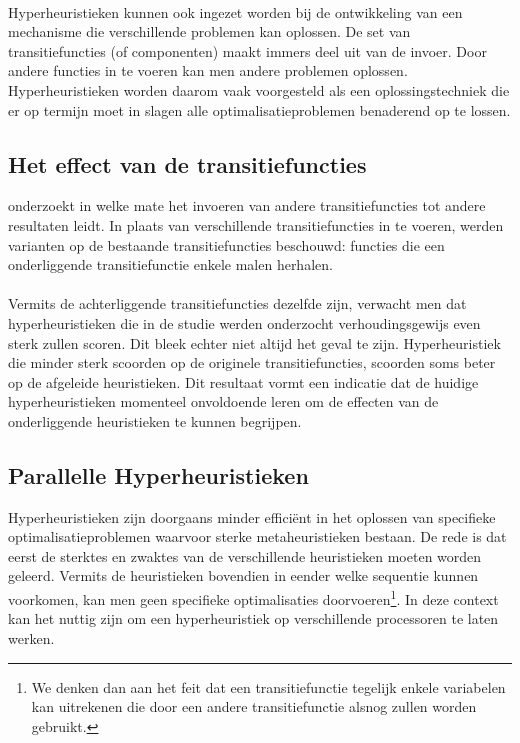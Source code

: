 \paragraph{}
Hyperheuristieken kunnen ook ingezet worden bij de ontwikkeling van een mechanisme die verschillende problemen kan oplossen. De set van transitiefuncties (of componenten) maakt immers deel uit van de invoer. Door andere functies in te voeren kan men andere problemen oplossen. Hyperheuristieken worden daarom vaak voorgesteld als een oplossingstechniek die er op termijn moet in slagen alle optimalisatieproblemen benaderend op te lossen.

\subsection{Het effect van de transitiefuncties}
\cite{DBLP:conf/ppsn/MisirVCB12} onderzoekt in welke mate het invoeren van andere transitiefuncties tot andere resultaten leidt. In plaats van verschillende transitiefuncties in te voeren, werden varianten op de bestaande transitiefuncties beschouwd: functies die een onderliggende transitiefunctie enkele malen herhalen.

\paragraph{}
Vermits de achterliggende transitiefuncties dezelfde zijn, verwacht men dat hyperheuristieken die in de studie werden onderzocht verhoudingsgewijs even sterk zullen scoren. Dit bleek echter niet altijd het geval te zijn. Hyperheuristiek die minder sterk scoorden op de originele transitiefuncties, scoorden soms beter op de afgeleide heuristieken. Dit resultaat vormt een indicatie dat de huidige hyperheuristieken momenteel onvoldoende leren om de effecten van de onderliggende heuristieken te kunnen begrijpen.

\subsection{Parallelle Hyperheuristieken}

Hyperheuristieken zijn doorgaans minder effici\"ent in het oplossen van specifieke optimalisatieproblemen waarvoor sterke metaheuristieken bestaan. De rede is dat eerst de sterktes en zwaktes van de verschillende heuristieken moeten worden geleerd. Vermits de heuristieken bovendien in eender welke sequentie kunnen voorkomen, kan men geen specifieke optimalisaties doorvoeren\footnote{We denken dan aan het feit dat een transitiefunctie tegelijk enkele variabelen kan uitrekenen die door een andere transitiefunctie alsnog zullen worden gebruikt.}. In deze context kan het nuttig zijn om een hyperheuristiek op verschillende processoren te laten werken.

